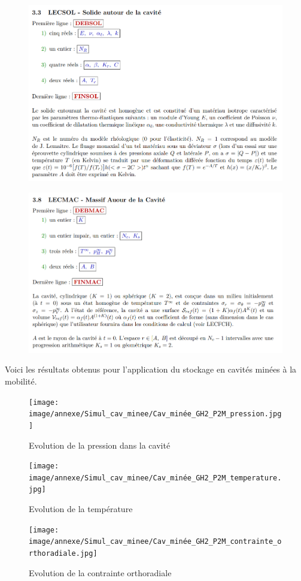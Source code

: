 \documentclass[11pt,french,a4paper]{article}
\begin{document}
\begin{figure}[h]
\centering
\includegraphics[width=.8\linewidth]{image/annexe/DEMETHER/Notice DEMETHER 3.png}
\end{figure}

\begin{figure}[h]
\centering
\includegraphics[width=.8\linewidth]{image/annexe/DEMETHER/Notice DEMETHER 4.png}
\end{figure}
\FloatBarrier
Voici les résultats obtenus pour l’application du stockage en cavités minées à la mobilité.

\begin{figure}[h]
\centering
\texttt{[image: image/annexe/Simul\_cav\_minee/Cav\_minée\_GH2\_P2M\_pression.jpg]}
    \caption{Evolution de la pression dans la cavité}
\end{figure}

\begin{figure}[h]
\centering
\texttt{[image: image/annexe/Simul\_cav\_minee/Cav\_minée\_GH2\_P2M\_temperature.jpg]}
\caption{Evolution de la température}
\end{figure}

\begin{figure}[h]
\centering
\texttt{[image: image/annexe/Simul\_cav\_minee/Cav\_minée\_GH2\_P2M\_contrainte\_orthoradiale.jpg]}
\caption{Evolution de la contrainte orthoradiale}
\end{figure}
\end{document}
